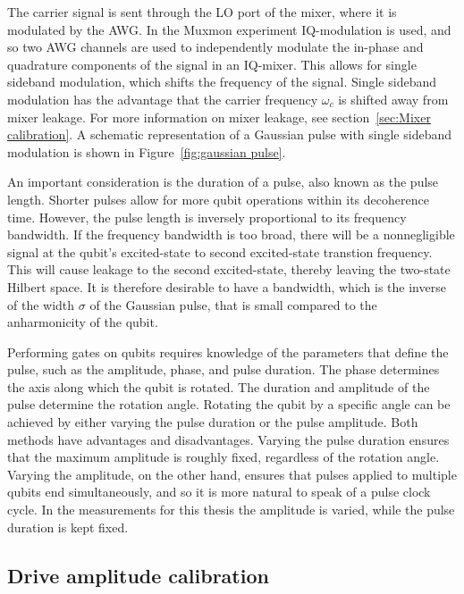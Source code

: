        The carrier signal is sent through the LO port of the mixer, where it is modulated by the AWG. In the Muxmon experiment IQ-modulation is used, and so two AWG channels are used to independently modulate the in-phase and quadrature components of the signal in an IQ-mixer. This allows for single sideband modulation, which shifts the frequency of the signal. Single sideband modulation has the advantage that the carrier frequency $\omega_c$ is shifted away from mixer leakage. For more information on mixer leakage, see section~\ref{sec:Mixer calibration}. A schematic representation of a Gaussian pulse with single sideband modulation is shown in Figure~\ref{fig:gaussian pulse}.

        An important consideration is the duration of a pulse, also known as the pulse length. Shorter pulses allow for more qubit operations within its decoherence time. However, the pulse length is inversely proportional to its frequency bandwidth. If the frequency bandwidth is too broad, there will be a nonnegligible signal at the qubit's excited-state to second excited-state transtion frequency. This will cause leakage to the second excited-state, thereby leaving the two-state Hilbert space. It is therefore desirable to have a bandwidth, which is the inverse of the width $\sigma$ of the Gaussian pulse, that is small compared to the anharmonicity of the qubit.

        Performing gates on qubits requires knowledge of the parameters that define the pulse, such as the amplitude, phase, and pulse duration. The phase determines the axis along which the qubit is rotated. The duration and amplitude of the pulse determine the rotation angle. Rotating the qubit by a specific angle can be achieved by either varying the pulse duration or the pulse amplitude. Both methods have advantages and disadvantages. Varying the pulse duration ensures that the maximum amplitude is roughly fixed, regardless of the rotation angle. Varying the amplitude, on the other hand, ensures that pulses applied to multiple qubits end simultaneously, and so it is more natural to speak of a pulse clock cycle. In the measurements for this thesis the amplitude is varied, while the pulse duration is kept fixed.

      \subsection{Drive amplitude calibration}
        \label{ssec:Rabi}

